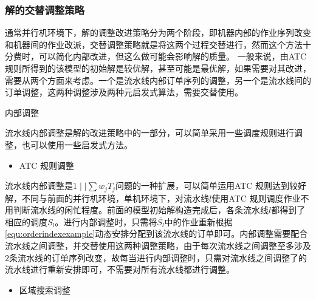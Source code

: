 \subsubsection{解的交替调整策略}
通常并行机环境下，解的调整改进策略分为两个阶段，即机器内部的作业序列改变和机器间的作业改派，交替调整策略就是将这两个过程交替进行\cite{史烨2011}，然而这个方法十分费时，可以简化内部改进，但这么做可能会影响解的质量。
一般来说，由ATC 规则所得到的该模型的初始解是较优解，甚至可能是最优解，如果需要对其改进，需要从两个方面来考虑。一个是流水线内部订单序列的调整，另一个是流水线间的订单调整，这两种调整涉及两种元启发式算法，需要交替使用。
\begin{asparaenum}
\item 内部调整

流水线内部调整是解的改进策略中的一部分，可以简单采用一些调度规则进行调整，也可以使用一些启发式方法。
\begin{itemize}
\item ATC 规则调整
\end{itemize}

流水线内部调整是$1\mid\mid \sum w_jT_j$问题的一种扩展，可以简单运用ATC 规则达到较好解，不同与前面的并行机环境，单机环境下，对流水线$l$使用ATC 规则调度作业不用判断流水线的闲忙程度。前面的模型初始解构造完成后，各条流水线$l$都得到了相应的调度$S_l$。进行内部调整时，只需将$\overline{S_l}$中的作业重新根据\eqref{equ:orderindexexample}动态安排分配到该流水线的订单即可。内部调整需要配合流水线之间调整，并交替使用这两种调整策略，由于每次流水线之间调整至多涉及$2$条流水线的订单序列改变，故每当进行内部调整时，只需对流水线之间调整了的流水线进行重新安排即可，不需要对所有流水线都进行调整。


\begin{itemize}
\item 区域搜索调整
\end{itemize}


\end{asparaenum}
